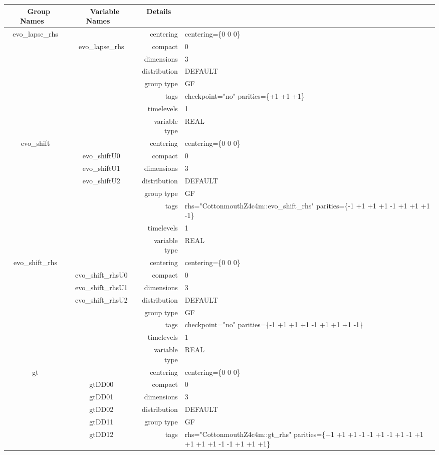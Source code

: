 \begin{tabular*}{150mm}{|c|c@{\extracolsep{\fill}}|rl|} \hline 
~ {\bf Group Names} ~ & ~ {\bf Variable Names} ~  &{\bf Details} ~ & ~ \\ 
\hline 
evo\_lapse\_rhs &  & centering & centering=\{0 0 0\} \\ 
 & evo\_lapse\_rhs & compact & 0 \\ 
 &  & dimensions & 3 \\ 
 &  & distribution & DEFAULT \\ 
 &  & group type & GF \\ 
 &  & tags & checkpoint="no" parities=\{+1 +1 +1\} \\ 
 &  & timelevels & 1 \\ 
 &  & variable type & REAL \\ 
\hline 
evo\_shift &  & centering & centering=\{0 0 0\} \\ 
 & evo\_shiftU0 & compact & 0 \\ 
 & evo\_shiftU1 & dimensions & 3 \\ 
 & evo\_shiftU2 & distribution & DEFAULT \\ 
 &  & group type & GF \\ 
 &  & tags & rhs="CottonmouthZ4c4m::evo\_shift\_rhs" parities=\{-1 +1 +1  +1 -1 +1  +1 +1 -1\} \\ 
 &  & timelevels & 1 \\ 
 &  & variable type & REAL \\ 
\hline 
evo\_shift\_rhs &  & centering & centering=\{0 0 0\} \\ 
 & evo\_shift\_rhsU0 & compact & 0 \\ 
 & evo\_shift\_rhsU1 & dimensions & 3 \\ 
 & evo\_shift\_rhsU2 & distribution & DEFAULT \\ 
 &  & group type & GF \\ 
 &  & tags & checkpoint="no" parities=\{-1 +1 +1  +1 -1 +1  +1 +1 -1\} \\ 
 &  & timelevels & 1 \\ 
 &  & variable type & REAL \\ 
\hline 
gt &  & centering & centering=\{0 0 0\} \\ 
 & gtDD00 & compact & 0 \\ 
 & gtDD01 & dimensions & 3 \\ 
 & gtDD02 & distribution & DEFAULT \\ 
 & gtDD11 & group type & GF \\ 
 & gtDD12 & tags & rhs="CottonmouthZ4c4m::gt\_rhs" parities=\{+1 +1 +1  -1 -1 +1  -1 +1 -1  +1 +1 +1  +1 -1 -1  +1 +1 +1\} \\ 

\end{tabular*}
